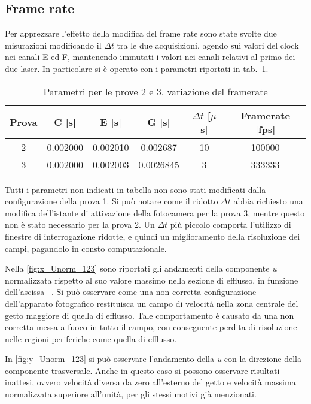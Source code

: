 \documentclass{article} %
\newcommand{\xd}{\nicefrac{\textrm{x}}{\textrm{D}}\ }
\begin{document}
\subsection{Frame rate}
Per apprezzare l'effetto della modifica del frame rate sono state svolte due misurazioni modificando il $\Delta t$ tra le due acquisizioni, agendo sui valori del clock nei canali E ed F, mantenendo immutati i valori nei canali relativi al primo dei due laser. In particolare si è operato con i parametri riportati in tab.~\ref{tab:parametri_fps}.\par
\begin{table}[h!]
	\centering
	\begin{tabular}{@{}cccccc@{}}\toprule
		Prova & C [s] & E [s] & G [s] & $\Delta t$ [$\mu$s] & Framerate [fps] \\ \midrule
		2 & 0.002000 & 0.002010 & 0.002687 & 10 & 100000 \\ \midrule
		3 & 0.002000 & 0.002003 & 0.0026845 & 3 & 333333 \\ \bottomrule
	\end{tabular}
	\caption{Parametri per le prove 2 e 3, variazione del framerate}
	\label{tab:parametri_fps}
\end{table}
Tutti i parametri non indicati in tabella non sono stati modificati dalla configurazione della prova 1. Si può notare come il ridotto $\Delta t$ abbia richiesto una modifica dell'istante di attivazione della fotocamera per la prova 3, mentre questo non è stato necessario per la prova 2. Un $\Delta t$ più piccolo comporta l'utilizzo di finestre di interrogazione ridotte, e quindi un miglioramento della risoluzione dei campi, pagandolo in consto computazionale.\par
Nella \cref{fig:x_Unorm_123} sono riportati gli andamenti della componente \textit{u} normalizzata rispetto al suo valore massimo nella sezione di efflusso, in funzione dell'ascissa \xd. Si può osservare come una non corretta configurazione dell'apparato fotografico restituisca un campo di velocità nella zona centrale del getto maggiore di quella di efflusso. Tale comportamento è causato da una non corretta messa a fuoco in tutto il campo, con conseguente perdita di risoluzione nelle regioni periferiche come quella di efflusso.\par
In \cref{fig:y_Unorm_123} si può osservare l'andamento della \textit{u} con la direzione della componente trasversale. Anche in questo caso si possono osservare risultati inattesi, ovvero velocità diversa da zero all'esterno del getto e velocità massima normalizzata superiore all'unità, per gli stessi motivi già menzionati.\par 
\end{document}
